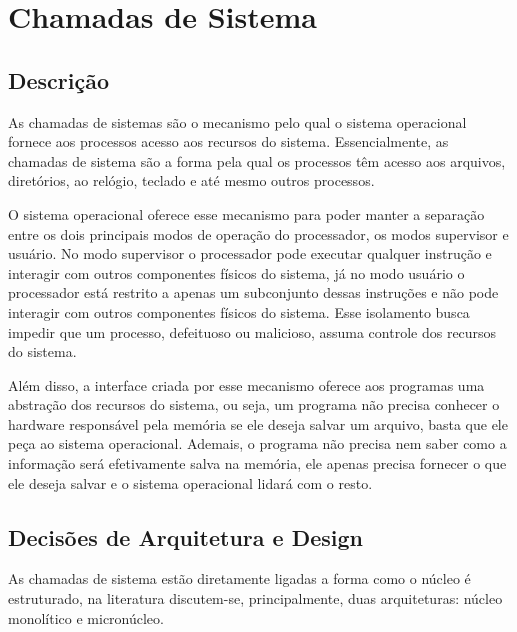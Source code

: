\chapter{Chamadas de Sistema}
\section{Descrição}
%
As chamadas de sistemas são o mecanismo pelo qual o sistema operacional fornece aos processos acesso aos recursos do sistema. Essencialmente, as chamadas de sistema são a forma pela qual os processos têm acesso aos arquivos, diretórios, ao relógio, teclado e até mesmo outros processos. 

O sistema operacional oferece esse mecanismo para poder manter a separação entre os dois principais modos de operação do processador, os modos supervisor e usuário. No modo supervisor o processador pode executar qualquer instrução e interagir com outros componentes físicos do sistema, já no modo usuário o processador está restrito a apenas um subconjunto dessas instruções e não pode interagir com outros componentes físicos do sistema. Esse isolamento busca impedir que um processo, defeituoso ou malicioso, assuma controle dos recursos do sistema.

Além disso, a interface criada por esse mecanismo oferece aos programas uma abstração dos recursos do sistema, ou seja, um programa não precisa conhecer o hardware responsável pela memória se ele deseja salvar um arquivo, basta que ele peça ao sistema operacional. Ademais, o programa não precisa nem saber como a informação será efetivamente salva na memória, ele apenas precisa fornecer o que ele deseja salvar e o sistema operacional lidará com o resto.

\section{Decisões de Arquitetura e Design}
%
%
As chamadas de sistema estão diretamente ligadas a forma como o núcleo é estruturado, na literatura discutem-se, principalmente, duas arquiteturas: núcleo monolítico e micronúcleo.

